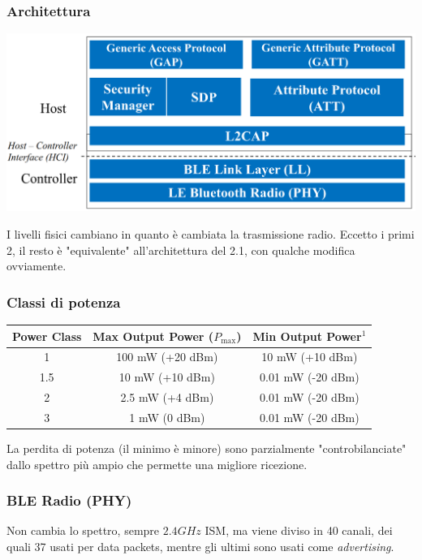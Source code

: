 \subsubsection{Architettura}
\begin{center}
	\includegraphics[width=0.8\linewidth]{img/wpan/blearch}
\end{center}

I livelli fisici cambiano in quanto è cambiata la trasmissione radio. Eccetto i primi 2, il resto è "equivalente" all'architettura del 2.1, con qualche modifica ovviamente.

\subsubsection{Classi di potenza}
\begin{center}
	\begin{tabular}{|c|c|c|}
		\hline
		\textbf{Power Class} & \textbf{Max Output Power ($P_{\text{max}}$)} & \textbf{Min Output Power$^1$} \\
		\hline
		1   & 100 mW (+20 dBm)  & 10 mW (+10 dBm)  \\
		1.5 & 10 mW (+10 dBm)   & 0.01 mW (-20 dBm) \\
		2   & 2.5 mW (+4 dBm)   & 0.01 mW (-20 dBm) \\
		3   & 1 mW (0 dBm)      & 0.01 mW (-20 dBm) \\
		\hline
	\end{tabular}
\end{center}
La perdita di potenza (il minimo è minore) sono parzialmente "controbilanciate" dallo spettro più ampio che permette una migliore ricezione.

\subsubsection{BLE Radio (PHY)}

Non cambia lo spettro, sempre $2.4GHz$ ISM, ma viene diviso in 40 canali, dei quali 37 usati per data packets, mentre gli ultimi sono usati come \textit{advertising}.

